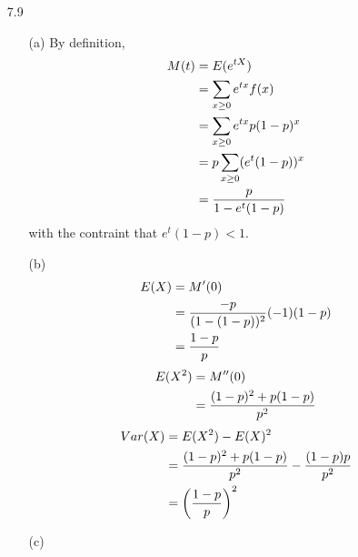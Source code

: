 \documentclass[english, 11pt]{article}
\begin{document}
\begin{itemize}
  \item[7.9]
  \begin{itemize}
    \item[(a)] By definition,
    \begin{align*}
      M(t) & = E(e^{tX}) \\
           & = \sum_{x\geq 0} e^{tx}f(x) \\
           & = \sum_{x \geq 0} e^{tx}p(1-p)^x \\
           & = p \sum_{x \geq 0} (e^t(1-p))^x \\
           & = \frac{p}{1 - e^t(1-p)}
    \end{align*}
    with the contraint that $e^t(1-p) < 1$.
    \item[(b)]
    \begin{align*}
      E(X) & = M'(0) \\
           & = \frac{-p}{(1-(1-p))^2}(-1)(1-p) \\
           & = \frac{1-p}{p}
    \end{align*}
    \begin{align*}
      E(X^2) & = M''(0) \\
      & = \frac{(1-p)^2 + p(1-p)}{p^2}
    \end{align*}
    \begin{align*}
      Var(X) & = E(X^2) - E(X)^2 \\
      & = \frac{(1-p)^2 + p(1-p)}{p^2} - \frac{(1-p)p}{p^2} \\
      & = \left( \frac{1-p}{p} \right)^2
    \end{align*}
    \item[(c)]
  \end{itemize}


\end{itemize}
\end{document}
